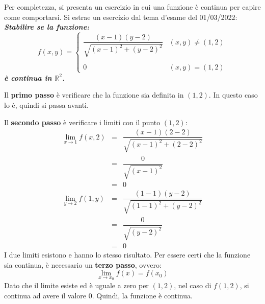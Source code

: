 \documentclass[a4paper]{article}
\begin{document}
	\noindent
	Per completezza, si presenta un esercizio in cui una funzione è continua per capire come comportarsi. Si estrae un esercizio dal tema d'esame del 01/03/2022: \textcolor{Green4}{\textbf{\emph{Stabilire se la funzione:}}
	\begin{equation*}
		f\left(x,y\right) = \begin{cases}
			\dfrac{\left(x-1\right)\left(y-2\right)}{\sqrt{\left(x-1\right)^{2} + \left(y-2\right)^{2}}} & \left(x,y\right) \ne \left(1,2\right) \\
			\\
			0	& \left(x,y\right) = \left(1,2\right)
		\end{cases}
	\end{equation*}
	\textbf{\emph{è continua in $\mathbb{R}^{2}$.}}}\newpage

	\noindent
	Il \textbf{primo passo} è verificare che la funzione sia definita in $\left(1,2\right)$. In questo caso lo è, quindi si passa avanti.\newline

	\noindent
	Il \textbf{secondo passo} è verificare i limiti con il punto $\left(1,2\right)$:
	\begin{equation*}
		\begin{array}{rcl}
			\displaystyle\lim_{x \rightarrow 1} f\left(x,2\right) &=& \dfrac{\left(x-1\right)\left(2-2\right)}{\sqrt{\left(x-1\right)^{2} + \left(2-2\right)^{2}}} \\ [2em]
			&=& \dfrac{0}{\sqrt{\left(x-1\right)^{2}}} \\ [2em]
			&=& 0 \\ [2em]
			\displaystyle\lim_{y \rightarrow 2} f\left(1,y\right) &=& \dfrac{\left(1-1\right)\left(y-2\right)}{\sqrt{\left(1-1\right)^{2} + \left(y-2\right)^{2}}} \\ [2em]
			&=& \dfrac{0}{\sqrt{\left(y-2\right)^{2}}} \\ [2em]
			&=& 0
		\end{array}
	\end{equation*}
	I due limiti esistono e hanno lo stesso risultato. Per essere certi che la funzione sia continua, è necessario un \textbf{terzo passo}, ovvero:
	\begin{equation*}
		\displaystyle\lim_{x \rightarrow x_{0}} f\left(x\right) = f\left(x_{0}\right)
	\end{equation*}
	Dato che il limite esiste ed è uguale a zero per $\left(1,2\right)$, nel caso di $f\left(1,2\right)$, si continua ad avere il valore $0$. Quindi, la funzione è continua.\newpage
\end{document}
